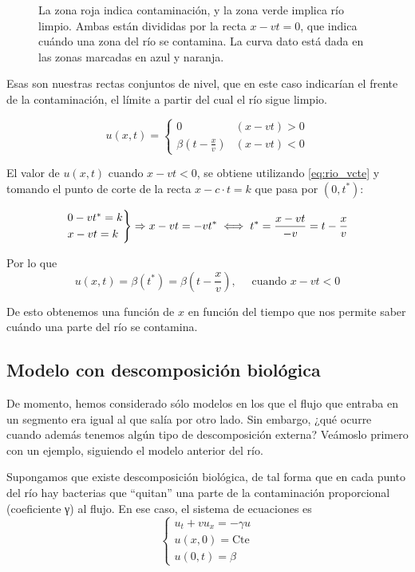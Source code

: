 		\begin{figure}[hbtp]
			\centering
			\caption{La zona roja indica contaminación, y la zona verde implica río limpio. Ambas están divididas por la recta $x - vt = 0$, que indica cuándo una zona del río se contamina. La curva dato está dada en las zonas marcadas en azul y naranja.}
			\label{fig:ContaminacionRio}
		\end{figure}

		Esas son nuestras rectas conjuntos de nivel, que en este caso indicarían el frente de la contaminación, el límite a partir del cual el río sigue limpio.

		$$u(x,t) =
			\begin{cases}
				0                      & (x-vt) > 0 \\
				\beta(t - \frac{x}{v}) & (x-vt) < 0
			\end{cases}
		$$

		El valor de $u(x,t)$ cuando $x-vt < 0$, se obtiene utilizando \ref{eq:rio_vcte} y tomando el punto de corte de la recta $x-c \cdot t=k$ que pasa por $(0,t^*)$:

		$$
		\begin{rcases}
			0 - vt^{*} = k \\
			x - vt = k
		\end{rcases}
		 \Rightarrow x-vt = -vt^{*} \iff t^* = \frac{x-vt}{-v} = t - \frac{x}{v}$$

		Por lo que
		$$u(x,t) = \beta(t^*) = \beta(t - \frac{x}{v}), \quad \text{ cuando } x - vt < 0$$

		De esto obtenemos una función de $x$ en función del tiempo que nos permite saber cuándo una parte del río se contamina.

	\subsection{Modelo con descomposición biológica}

	De momento, hemos considerado sólo modelos en los que el flujo que entraba en un segmento era igual al que salía por otro lado. Sin embargo, ¿qué ocurre cuando además tenemos algún tipo de descomposición externa? Veámoslo primero con un ejemplo, siguiendo el modelo anterior del río.

		Supongamos que existe descomposición biológica, de tal forma que en cada punto del río hay bacterias que ``quitan'' una parte de la contaminación proporcional (coeficiente γ) al flujo. En ese caso, el sistema de ecuaciones es \[
		\begin{cases}
		u_t + vu_x = -\gamma u \\
		u(x,0) = \text{Cte} \\
		u(0,t) = \beta
		\end{cases} \]

